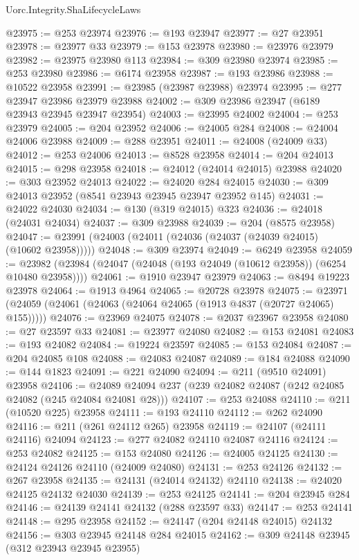 \begin{lexlean}{Uorc.Integrity.ShaLifecycleLaws}
\begin{coremodule}
@23975 := @253 @23974
@23976 := @193 @23947
@23977 := @27 @23951
@23978 := @23977 @33
@23979 := @153 @23978
@23980 := @23976 @23979
@23982 := @23975 @23980 @113
@23984 := @309 @23980 @23974
@23985 := @253 @23980
@23986 := @6174 @23958
@23987 := @193 @23986
@23988 := @10522 @23958
@23991 := @23985 (@23987 @23988) @23974
@23995 := @277 @23947 @23986 @23979 @23988
@24002 := @309 @23986 @23947 (@6189 @23943 @23945 @23947 @23954)
@24003 := @23995 @24002
@24004 := @253 @23979
@24005 := @204 @23952
@24006 := @24005 @284
@24008 := @24004 @24006 @23988
@24009 := @288 @23951
@24011 := @24008 (@24009 @33)
@24012 := @253 @24006
@24013 := @8528 @23958
@24014 := @204 @24013
@24015 := @298 @23958
@24018 := @24012 (@24014 @24015) @23988
@24020 := @303 @23952 @24013
@24022 := @24020 @284 @24015
@24030 := @309 @24013 @23952 (@8541 @23943 @23945 @23947 @23952 @145)
@24031 := @24022 @24030
@24034 := @130 (@319 @24015) @323
@24036 := @24018 (@24031 @24034)
@24037 := @309 @23988
@24039 := @204 (@8575 @23958)
@24047 := @23991 (@24003 (@24011 (@24036 (@24037 (@24039 @24015) (@10602 @23958)))))
@24048 := @309 @23974
@24049 := @6249 @23958
@24059 := @23982 (@23984 (@24047 (@24048 (@193 @24049 (@10612 @23958)) (@6254 @10480 @23958))))
@24061 := @1910 @23947 @23979
@24063 := @8494 @19223 @23978
@24064 := @1913 @4964
@24065 := @20728 @23978
@24075 := @23971 (@24059 (@24061 (@24063 (@24064 @24065 (@1913 @4837 (@20727 @24065) @155)))))
@24076 := @23969 @24075
@24078 := @2037 @23967 @23958
@24080 := @27 @23597 @33
@24081 := @23977 @24080
@24082 := @153 @24081
@24083 := @193 @24082
@24084 := @19224 @23597
@24085 := @153 @24084
@24087 := @204 @24085 @108
@24088 := @24083 @24087
@24089 := @184 @24088
@24090 := @144 @1823
@24091 := @221 @24090
@24094 := @211 (@9510 @24091) @23958
@24106 := @24089 @24094 @237 (@239 @24082 @24087 (@242 @24085 @24082 (@245 @24084 @24081 @28)))
@24107 := @253 @24088
@24110 := @211 (@10520 @225) @23958
@24111 := @193 @24110
@24112 := @262 @24090
@24116 := @211 (@261 @24112 @265) @23958
@24119 := @24107 (@24111 @24116) @24094
@24123 := @277 @24082 @24110 @24087 @24116
@24124 := @253 @24082
@24125 := @153 @24080
@24126 := @24005 @24125
@24130 := @24124 @24126 @24110 (@24009 @24080)
@24131 := @253 @24126
@24132 := @267 @23958
@24135 := @24131 (@24014 @24132) @24110
@24138 := @24020 @24125 @24132 @24030
@24139 := @253 @24125
@24141 := @204 @23945 @284
@24146 := @24139 @24141 @24132 (@288 @23597 @33)
@24147 := @253 @24141
@24148 := @295 @23958
@24152 := @24147 (@204 @24148 @24015) @24132
@24156 := @303 @23945 @24148 @284 @24015
@24162 := @309 @24148 @23945 (@312 @23943 @23945 @23955)

\end{coremodule}
\end{lexlean}
